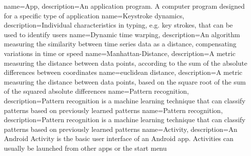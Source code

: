  {
  name=App,
  description={An application program. A computer program designed for a specific type of application}
}
 {
  name=Keystroke dynamics,
  description={Individual characteristics in typing, e.g. key strokes, that can be used to identify users}
}
 {
  name=Dynamic time warping,
  description={An algorithm measuring the similarity between time series data as a distance, compensating variations in time or speed}
}
 {
  name=Manhattan-Distance,
  description={A metric measuring the distance between data points, according to the sum of the absolute differences between coordinates}
}
 {
  name=euclidean distance,
  description={A metric measuring the distance between data points, based on the square root of the sum of the squared absolute differences}
}
 {
  name=Pattern recognition,
  description={Pattern recognition is a machine learning technique that can classify patterns based on previously learned patterns}
}
 {
  name=Pattern recognition,
  description={Pattern recognition is a machine learning technique that can classify patterns based on previously learned patterns}
}
 {
  name=Activity,
  description={An Android Activity is the basic user interface of an Android \gls{app}. Activities can usually be launched from other \glspl{app} or the start menu}
}

